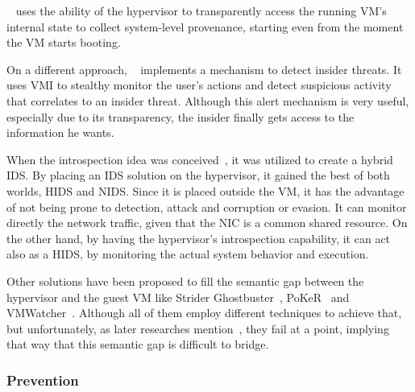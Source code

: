 \par ~\cite{macko2011collecting} uses the ability of the hypervisor to transparently access the running \ac{VM}’s internal state to collect system-level provenance, starting even from the moment the \ac{VM} starts booting. 

\par On a different approach, ~\cite{crawford2013insider} implements a mechanism to detect insider threats. It uses \ac{VMI} to stealthy monitor the user’s actions and detect suspicious activity that correlates to an insider threat. Although this alert mechanism is very useful, especially due to its transparency, the insider finally gets access to the information he wants.

\par When the introspection idea was conceived~\cite{garfinkel2003virtual}, it was utilized to create a hybrid \ac{IDS}. By placing an \ac{IDS} solution on the hypervisor, it gained the best of both worlds, \ac{HIDS} and \ac{NIDS}. Since it is placed outside the \ac{VM}, it has the advantage of not being prone to detection, attack and corruption or evasion. It can monitor directly the network traffic, given that the \ac{NIC} is a common shared resource. On the other hand, by having the hypervisor’s introspection capability, it can act also as a \ac{HIDS}, by monitoring the actual system behavior and execution. 

\par Other solutions have been proposed to fill the semantic gap between the hypervisor and the guest \ac{VM} like Strider Ghostbuster~\cite{wang2005detecting}, PoKeR~\cite{riley2009multi} and VMWatcher~\cite{jiang2007stealthy}. Although all of them employ different techniques to achieve that, but unfortunately, as later researches mention~\cite{mahapatra2011online}, they fail at a point, implying that way that this semantic gap is difficult to bridge. 

\subsubsection{Prevention}

